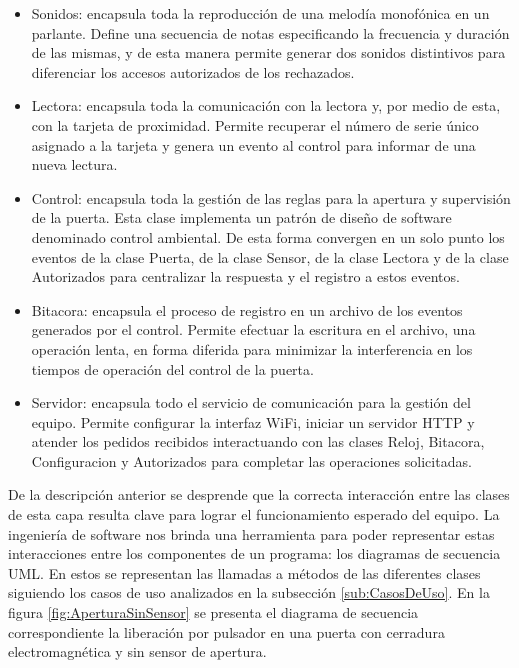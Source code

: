 \begin{itemize}
	\item Sonidos: encapsula toda la reproducción de una melodía monofónica en un parlante. Define una secuencia de notas especificando la frecuencia y duración de las mismas, y de esta manera permite generar dos sonidos distintivos para diferenciar los accesos autorizados de los rechazados.
	
	\item Lectora: encapsula toda la comunicación con la lectora y, por medio de esta, con la tarjeta de proximidad. Permite recuperar el número de serie único asignado a la tarjeta y genera un evento al control para informar de una nueva lectura.

	\item Control: encapsula toda la gestión de las reglas para la apertura y supervisión de la puerta. Esta clase implementa un patrón de diseño de software denominado control ambiental. De esta forma convergen en un solo punto los eventos de la clase Puerta, de la clase Sensor, de la clase Lectora y de la clase Autorizados para centralizar la respuesta y el registro a estos eventos. 
	
	\item Bitacora: encapsula el proceso de registro en un archivo de los eventos generados por el control. Permite efectuar la escritura en el archivo, una operación lenta, en forma diferida para minimizar la interferencia en los tiempos de operación del control de la puerta.
	
	\item Servidor: encapsula todo el servicio de comunicación para la gestión del equipo. Permite configurar la interfaz WiFi, iniciar un servidor HTTP y atender los pedidos recibidos interactuando con las clases Reloj, Bitacora, Configuracion y Autorizados para completar las operaciones solicitadas.
	
\end{itemize}

De la descripción anterior se desprende que la correcta interacción entre las clases de esta capa resulta clave para lograr el funcionamiento esperado del equipo. La ingeniería de software nos brinda una herramienta para poder representar estas interacciones entre los componentes de un programa: los diagramas de secuencia UML\cite{noauthor_diagrama_2019}. En estos se representan las llamadas a métodos de las diferentes clases siguiendo los casos de uso analizados en la subsección \ref{sub:CasosDeUso}. En la figura \ref{fig:AperturaSinSensor} se presenta el diagrama de secuencia correspondiente la liberación por pulsador en una puerta con cerradura electromagnética y sin sensor de apertura.

